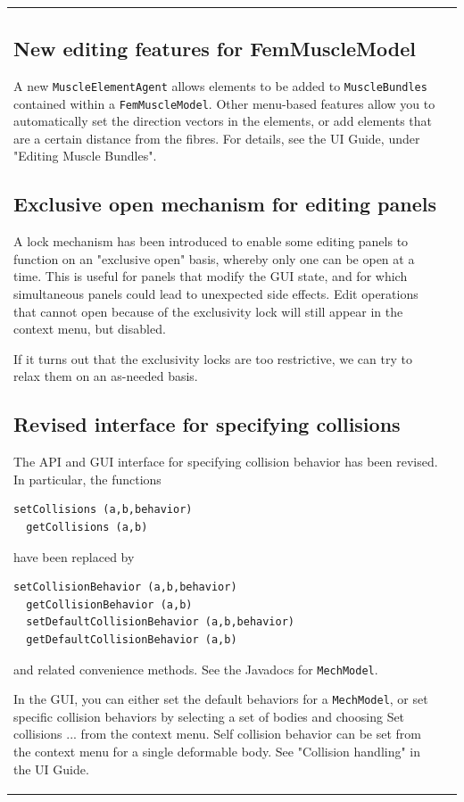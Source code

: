 \documentclass{article}
\begin{document}
\begin{tabular}{ll}
\subsection*{New editing features for FemMuscleModel}

A new {\tt MuscleElementAgent} allows elements to be added to {\tt MuscleBundles}
contained within a {\tt FemMuscleModel}. Other menu-based features allow you
to automatically set the direction vectors in the elements, or add
elements that are a certain distance from the fibres. For details,
see the UI Guide, under "Editing Muscle Bundles".

\subsection*{Exclusive open mechanism for editing panels}

A lock mechanism has been introduced to enable some editing panels to
function on an "exclusive open" basis, whereby only one can be open at
a time. This is useful for panels that modify the GUI state, and for
which simultaneous panels could lead to unexpected side effects.
Edit operations that cannot open because of the exclusivity lock will
still appear in the context menu, but disabled. 

If it turns out that the exclusivity locks are too restrictive, we can
try to relax them on an as-needed basis.

\subsection*{Revised interface for specifying collisions}

The API and GUI interface for specifying collision behavior has been
revised. In particular, the functions 

\begin{lstlisting}[]
  setCollisions (a,b,behavior)
  getCollisions (a,b)
\end{lstlisting}

have been replaced by

\begin{lstlisting}[]
  setCollisionBehavior (a,b,behavior)
  getCollisionBehavior (a,b)
  setDefaultCollisionBehavior (a,b,behavior)
  getDefaultCollisionBehavior (a,b)
\end{lstlisting}

and related convenience methods. See the Javadocs for {\tt MechModel}.

In the GUI, you can either set the default behaviors for a {\tt MechModel},
or set specific collision behaviors by selecting a set of
bodies and choosing {\sf Set collisions ...} from the context menu.
Self collision behavior can be set from the context menu for a single
deformable body. See "Collision handling" in the UI Guide.


\end{tabular}
\end{document}
